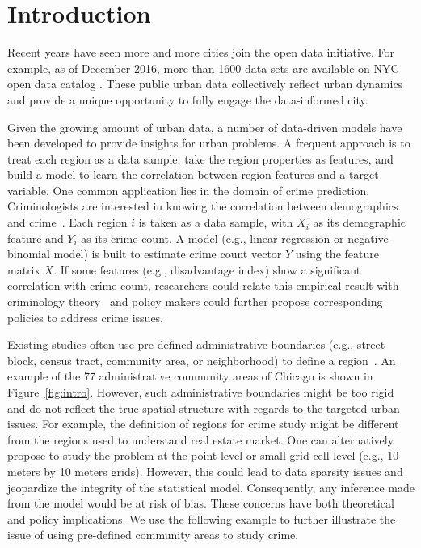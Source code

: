 \section{Introduction}

Recent years have seen more and more cities join the open data initiative. For example, as of December 2016, more than 1600 data sets are available on  NYC open data catalog \cite{nyc-open-data}. These public urban data collectively reflect urban dynamics and provide a unique opportunity to fully engage the data-informed city. 


Given the growing amount of urban data, a number of data-driven models have been developed to provide insights for urban problems. A frequent approach is to treat each region as a data sample, take the region properties as features, and build a model to learn the correlation between region features and a target variable. One common application lies in the domain of crime prediction. Criminologists are interested in knowing the correlation between demographics and crime~\cite{wang2016crime,wang2017non}. Each region $i$ is taken as a data sample, with $X_i$ as its demographic feature and $Y_i$ as its crime count. A model (e.g., linear regression or negative binomial model) is built to estimate crime count vector $Y$ using the feature matrix $X$. If some features (e.g., disadvantage index) show a significant correlation with crime count, researchers could relate this empirical result with criminology theory~\cite{graif2014urban} and policy makers could further propose corresponding policies to address crime issues.

Existing studies often use pre-defined administrative boundaries (e.g., street block, census tract, community area, or neighborhood) to define a region~\cite{yuan2012discovering,wang2016crime}. An example of the 77 administrative community areas of Chicago is shown in Figure~\ref{fig:intro}. However, such administrative boundaries might be too rigid and do not reflect the true spatial structure with regards to the targeted urban issues. For example, the definition of regions for crime study might be different from the regions used to understand real estate market. One can alternatively propose to study the problem at the point level or small grid cell level (e.g., 10 meters by 10 meters grids). However, this could lead to data sparsity issues and jeopardize the integrity of the statistical model. Consequently, any inference made from the model would be at risk of bias. These concerns have both theoretical and policy implications. We use the following example to further illustrate the issue of using pre-defined community areas to study crime.

